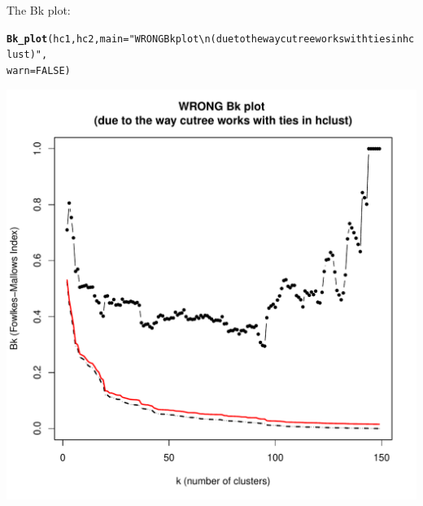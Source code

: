 \documentclass[shortnames,nojss,article]{jss}\usepackage[]{graphicx}\usepackage[]{color}
\makeatletter
\def\maxwidth{ %
  \ifdim\Gin@nat@width>\linewidth
    \linewidth
  \else
    \Gin@nat@width
  \fi
}
\newcommand{\hlnum}[1]{\textcolor[rgb]{0.686,0.059,0.569}{#1}}%
\newcommand{\hlstr}[1]{\textcolor[rgb]{0.192,0.494,0.8}{#1}}%
\newcommand{\hlstd}[1]{\textcolor[rgb]{0.345,0.345,0.345}{#1}}%
\newcommand{\hlkwc}[1]{\textcolor[rgb]{0.333,0.667,0.333}{#1}}%
\newcommand{\hlkwd}[1]{\textcolor[rgb]{0.737,0.353,0.396}{\textbf{#1}}}%
\newenvironment{kframe}{%
 \def\at@end@of@kframe{}%
 \ifinner\ifhmode%
  \def\at@end@of@kframe{\end{minipage}}%
  \begin{minipage}{\columnwidth}%
 \fi\fi%
 \def\FrameCommand##1{\hskip\@totalleftmargin \hskip-\fboxsep
 \colorbox{shadecolor}{##1}\hskip-\fboxsep
     \hskip-\linewidth \hskip-\@totalleftmargin \hskip\columnwidth}%
 \MakeFramed {\advance\hsize-\width
   \@totalleftmargin\z@ \linewidth\hsize
   \@setminipage}}%
 {\par\unskip\endMakeFramed%
 \at@end@of@kframe}
\newenvironment{knitrout}{}{} %
\makeatother
\begin{document}
The Bk plot:

\begin{knitrout}
\color{fgcolor}\begin{kframe}
\begin{alltt}
\hlkwd{Bk_plot}\hlstd{(hc1, hc2,} \hlkwc{main} \hlstd{=} \hlstr{"WRONG Bk plot \textbackslash{}n(due to the way cutree works with ties in hclust)"}\hlstd{,}
    \hlkwc{warn} \hlstd{=} \hlnum{FALSE}\hlstd{)}
\end{alltt}
\end{kframe}

{\centering \includegraphics[width=\maxwidth]{figure/Bk_plot_for_hclust_WRONG} 

}



\end{knitrout}
\end{document}
